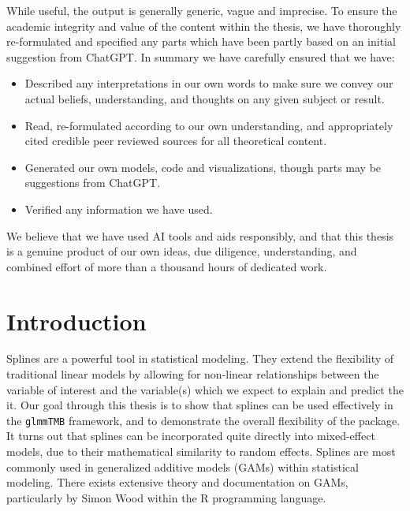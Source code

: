 \documentclass[12pt, twoside,hidelinks]{article}
\theoremstyle{definition}
\numberwithin{equation}{section}
\begin{document}
        While useful, the output is generally generic, vague and imprecise. To ensure the academic integrity and value of the content within the thesis, we have thoroughly re-formulated and specified any parts which have been partly based on an initial suggestion from ChatGPT. In summary we have carefully ensured that we have:

        \begin{itemize}
            \item Described any interpretations in our own words to make sure we convey our actual beliefs, understanding, and thoughts on any given subject or result. 
            \item Read, re-formulated according to our own understanding, and appropriately cited credible peer reviewed sources for all theoretical content. 
            \item Generated our own models, code and visualizations, though parts may be suggestions from ChatGPT.
            \item Verified any information we have used.
        \end{itemize}

       We believe that we have used AI tools and aids responsibly, and that this thesis is a genuine product of our own ideas, due diligence, understanding, and combined effort of more than a thousand hours of dedicated work.
        
\newpage
\tableofcontents
\newpage
\large
\section*{Introduction}


Splines are a powerful tool in statistical modeling. They extend the flexibility of traditional linear models by allowing for non-linear relationships between the variable of interest and the variable(s) which we expect to explain and predict the it. Our goal through this thesis is to show that splines can be used effectively in the \texttt{glmmTMB} framework, and to demonstrate the overall flexibility of the package.
It turns out that splines can be incorporated quite directly into mixed-effect models, due to their mathematical similarity to random effects.
Splines are most commonly used in generalized additive models (GAMs) within statistical modeling. There exists extensive theory and documentation on GAMs, particularly by Simon Wood \citep{wood2017} within the R programming language.
\newline
\end{document}
